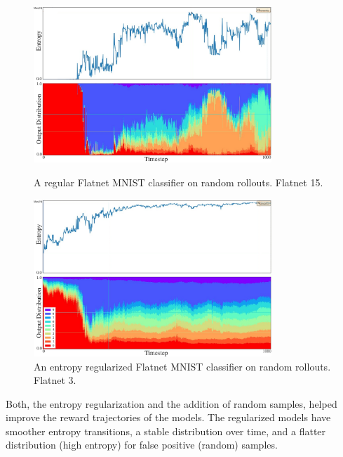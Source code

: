 \begin{figure}[H]
    \centering
    \includegraphics[width=0.8\textwidth]{images/Flatnet 15.pdf}
    \caption[A regular Flatnet MNIST classifier on random rollouts.]{A regular Flatnet MNIST classifier on random rollouts. Flatnet 15.}
    \includegraphics[width=0.8\textwidth]{images/Flatnet 3.pdf}
    \caption[An entropy regularized Flatnet MNIST classifier on random rollouts.]{An entropy regularized Flatnet MNIST classifier on random rollouts. Flatnet 3.}
    \label{fig:flatnet-comparison}
\end{figure}

Both, the entropy regularization and the addition of random samples, helped improve the reward trajectories of the models.
The regularized models have smoother entropy transitions, a stable distribution over time, and a flatter distribution (high entropy) for false positive (random) samples.




